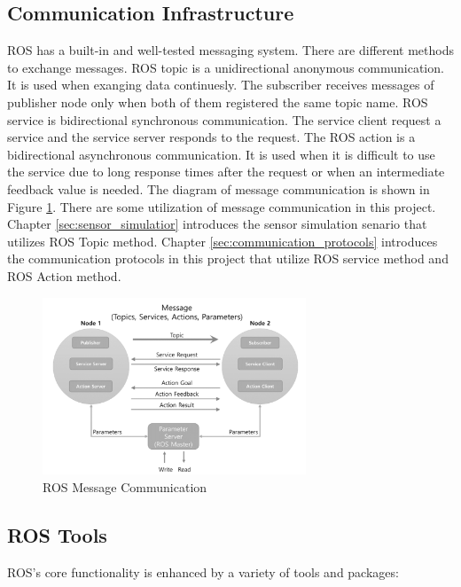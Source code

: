 \subsection{Communication Infrastructure}
ROS has a built-in and well-tested messaging system. There are different methods to exchange messages.  ROS topic is a unidirectional anonymous communication. It is used when exanging data continuesly. The subscriber receives messages of publisher node only when both of them registered the same topic name. ROS service is bidirectional synchronous communication. The service client request a service and the service server responds to the request. The ROS action is a bidirectional asynchronous communication. It is used when it is difficult to use the service due to long response times after the request or when an intermediate feedback value is needed.
The diagram of message communication is shown in Figure \ref{fig:ros_message_communication}.  There are some utilization of message communication in this project. Chapter \ref{sec:sensor_simulatior} introduces the sensor simulation senario that utilizes ROS Topic method. Chapter \ref{sec:communication_protocols} introduces the communication protocols in this project that utilize ROS service method and ROS Action method.   

\begin{figure}
    \centering
    \includegraphics[width = 0.7\textwidth]{content/images/ch2/ros_message_communication.png}
    \caption{ROS Message Communication}
    \label{fig:ros_message_communication}
    \end{figure}
    
\subsection{ROS Tools}
ROS's core functionality is enhanced by a variety of tools and packages:

